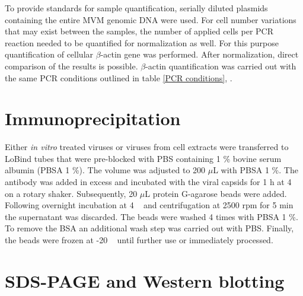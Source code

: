 To provide standards for sample quantification, serially diluted plasmids containing the entire MVM genomic DNA were used.
For cell number variations that may exist between the samples, the number of applied cells per PCR reaction needed to be quantified for normalization as well. For this purpose quantification of cellular $\beta$-actin gene was performed. After normalization, direct comparison of the results is possible. $\beta$-actin quantification was carried out with the same PCR conditions outlined in table \ref{PCR conditions}, \pageref{PCR conditions}.



\section{Immunoprecipitation}
Either \textit{in vitro} treated viruses or viruses from cell extracts were transferred to LoBind tubes that were pre-blocked with PBS containing 1 \% bovine serum albumin (PBSA 1 \%). The volume was adjusted to 200 $\mu$L with PBSA 1 \%. The antibody was added in excess and incubated with the viral capsids for 1 h at 4 \textcelsius~ on a rotary shaker. Subsequently, 20 $\mu$L protein G-agarose beads were added. Following overnight incubation at 4 \textcelsius~ and centrifugation at 2500 rpm for 5 min the supernatant was discarded. The beads were washed 4 times with PBSA 1 \%. To remove the BSA an additional wash step was carried out with PBS. Finally, the beads were frozen at -20 \textcelsius~ until further use or immediately processed. 


\section{SDS-PAGE and Western blotting}


